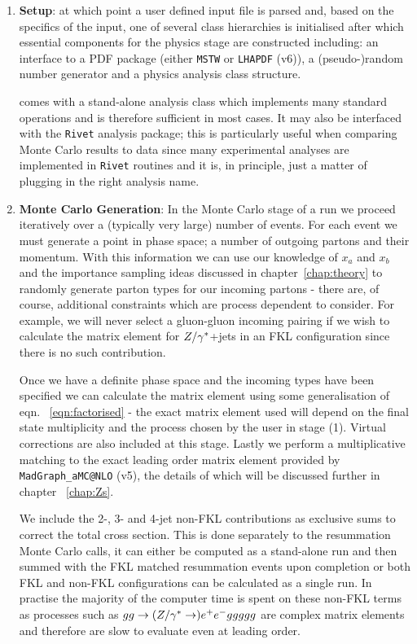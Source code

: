 		\begin{enumerate}
			\item \textbf{Setup}: at which point a user defined input file is parsed
			and, based on the specifics of the input, one of several class hierarchies is
			initialised after which essential components for the physics stage are constructed including:
			an interface to a PDF package (either \texttt{MSTW} or \texttt{LHAPDF} (v6)), a
			(pseudo-)random number generator and a physics analysis class structure.

			\HEJ comes with a stand-alone analysis class which implements many standard operations
			and is therefore sufficient in most cases.  It may also be interfaced with the
			\texttt{Rivet} analysis package; this is particularly useful when comparing Monte
			Carlo results to data since many experimental analyses are implemented in \texttt{Rivet}
			routines and it is, in principle, just a matter of plugging in the right analysis name.

			\item \textbf{Monte Carlo Generation}: In the Monte Carlo stage of a \HEJ run we
			proceed iteratively over a (typically very large) number of events.  For each
			event we must generate a point in phase space; a number of outgoing partons and their
			momentum.  With this information we can use our knowledge of $x_a$
			and $x_b$ and the importance sampling ideas discussed in chapter~\ref{chap:theory}
			to randomly generate parton types for our incoming partons - there are, of course,
			additional constraints which are process dependent to consider.  For example, we
			will never select a gluon-gluon incoming pairing if we wish to calculate the matrix
			element for $Z/\gamma^*$+jets in an FKL configuration since there is no such contribution.

			Once we have a definite phase space and the incoming types have been
			specified we can calculate the matrix element using some generalisation of eqn.
			~\eqref{eqn:factorised} - the exact matrix element used will depend on the
			final state multiplicity and the process chosen by the user in stage (1).  Virtual
			corrections are also included at this stage.  Lastly we perform a
			multiplicative matching to the exact leading order matrix element provided by
			\texttt{MadGraph\_aMC@NLO} (v5), the details of which will be discussed further in chapter
			~\ref{chap:Zs}.

			We include the 2-, 3- and 4-jet non-FKL contributions as exclusive sums to correct the
			total cross section.  This is done separately to the resummation Monte Carlo calls, it
			can either be computed as a stand-alone run and then summed with the FKL matched resummation
			events upon completion or both FKL and non-FKL configurations can be calculated as a single run.
			In practise the majority of the computer time is spent on these non-FKL terms as processes
			such as $gg\to(Z/\gamma^*\to)e^+e^-ggggg$ are complex matrix elements and therefore are slow to
			evaluate even at leading order.


\end{enumerate}
